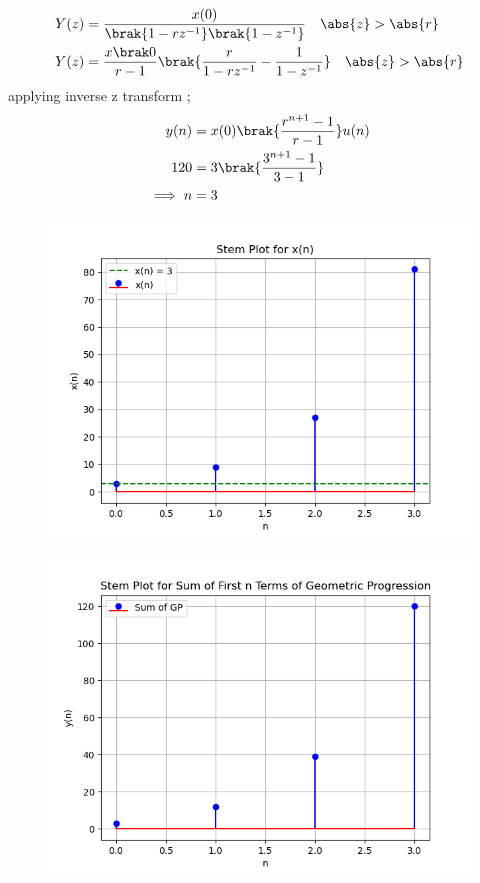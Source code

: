 \documentclass[journal,12pt,twocolumn]{IEEEtran}
\theoremstyle{remark}
\begin{document}
\begin{align}
Y(z) &= \frac{x(0)}{\brak{1-rz^{-1}}\brak{1-z^{-1}}} \quad \abs{z}> \abs{r}\\
Y(z)&=\frac{x\brak0}{r-1}\brak{\frac{r}{1-r z^{-1}}-\frac{1}{1- z^{-1}}}  \quad \abs{z} > \abs{r}
\end{align}
applying inverse z transform ;
\begin{align}
y(n) &= x(0)\brak{\frac{r^{n+1}-1}{r-1}}u(n)\\
120 &= 3\brak{ \frac{3^{n+1}- 1}{3-1}}  \\
\implies n &= 3
\end{align}
\begin{figure}
   \includegraphics[width=1\linewidth]{figs/i1.png}
\end{figure}
\begin{figure}
   \includegraphics[width=1\linewidth]{figs/i2.png}
\end{figure}
\end{document}
